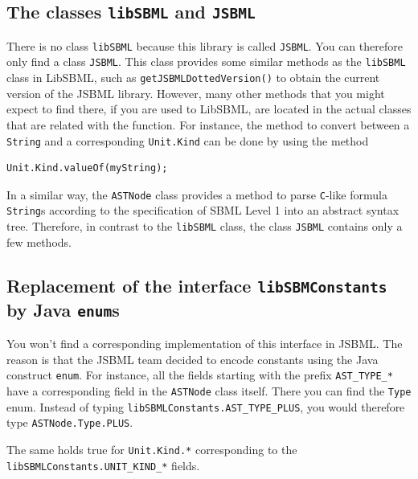 \documentclass[
  BCOR12mm,
  letterpaper,
  11pt,
  headsepline,
  pointlessnumbers,
  tablecaptionabove,
  onelinecaption,
  headinclude,
  appendixprefix,
  idxtotoc,
  bibtotoc,
  twoside,
  titlepage
]{scrartcl}
\begin{document}
\subsection{The classes \texttt{libSBML} and \texttt{JSBML}}

There is no class \texttt{libSBML} because this library is called
\texttt{JSBML}. You can therefore only find a class \texttt{JSBML}. This class
provides some similar methods as the \texttt{libSBML} class in LibSBML, such as
\texttt{getJSBMLDottedVersion()}
 to obtain the current
version of the JSBML library. However, many other methods that you might expect
to find there, if you are used to LibSBML, are located in the actual classes that
are related with the function. For instance, the method to convert between a
\texttt{String} and
a corresponding \texttt{Unit.Kind}
 can be done
by using the method
\begin{lstlisting}
Unit.Kind.valueOf(myString);
\end{lstlisting}
In a similar way, the \texttt{ASTNode} class provides a method to parse
\texttt{C}-like
formula \texttt{String}s according to the specification of SBML Level 1
\citep{Hucka2003} into an abstract syntax tree. Therefore, in contrast to the
\texttt{libSBML} class, the class \texttt{JSBML} contains only a few methods.


\subsection{Replacement of the interface \texttt{libSBMConstants} by Java \texttt{enum}s}

You won't find a corresponding implementation of this interface in 
JSBML. The reason is that the JSBML team decided to encode constants using the
Java construct \texttt{enum}. For instance, all the fields starting with the
prefix \texttt{AST\_TYPE\_*}
 have a
corresponding field in the \texttt{ASTNode} class itself. There you can find the
\texttt{Type}
 enum.
Instead of typing \texttt{libSBMLConstants.AST\_TYPE\_PLUS}, you would therefore
type \texttt{ASTNode.Type.PLUS}.

The same holds true for \texttt{Unit.Kind.*} corresponding to the
\texttt{libSBMLConstants.UNIT\_KIND\_*}
 fields.
\end{document}
